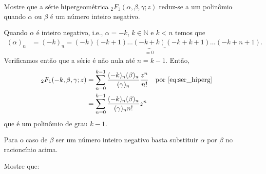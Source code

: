 \documentclass[a4paper,12pt, leqno, answers]{exam}
\begin{document}
\begin{questions}
    \question Mostre que a s\'{e}rie hipergeom\'{e}trica ${}_2F_1(\alpha, \beta, \gamma; z)$ reduz-se a um polin\^{o}mio quando $\alpha$ ou $\beta$ \'{e} um número inteiro negativo.
    \begin{solution}
        Quando $\alpha$ \'{e} inteiro negativo, i.e., $\alpha = -k$, $k \in \mathbb{N}$ e $k < n$ temos que
        \begin{align*}
            (\alpha)_n &= (-k)_n = (-k) (-k + 1) \ldots \underbrace{(-k + k)}_{= 0} (-k + k + 1) \ldots (-k + n + 1).
        \end{align*}
        Verificamos ent\~{a}o que a s\'{e}rie \'{e} n\~{a}o nula at\'{e} $n = k - 1$. Ent\~{a}o,
        \begin{align*}
            {}_2F_1(-k, \beta, \gamma; z) &= \sum_{n = 0}^{k - 1} \frac{(-k)_n (\beta)_n}{(\gamma)_n} \frac{z^n}{n!} && \text{por \eqref{eq:ser_hiperg}} \\
            &= \sum_{n = 0}^{k - 1} \frac{(-k)_n (\beta)_n}{(\gamma)_n n!} z^n 
        \end{align*}
        que \'{e} um polinômio de grau $k - 1$.

        Para o caso de $\beta$ ser um n\'{u}mero inteiro negativo basta substituir $\alpha$ por $\beta$ no racionc\'{i}nio acima.
    \end{solution}

     Mostre que:
\end{questions}
\end{document}
